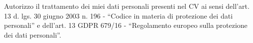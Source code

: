 %
\ifphoto

\vfill
\begin{center}
    \tiny
    Autorizzo il trattamento dei miei dati personali presenti nel CV ai sensi dell’art. 13 d. lgs. 30 giugno 2003 n. 196 - “Codice in materia di protezione dei dati personali” e dell’art. 13 GDPR 679/16 - “Regolamento europeo sulla protezione dei dati personali”.
\end{center}

\fi
